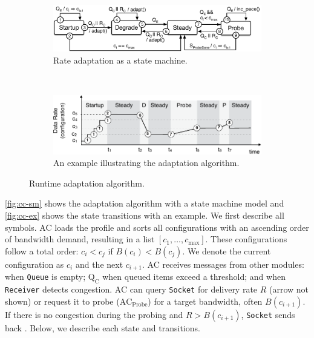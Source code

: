 \begin{figure}
  \begin{subfigure}[t]{\columnwidth}
    \centering
    \includegraphics[width=\columnwidth]{figures/cc.pdf}
    \caption{Rate adaptation as a state machine.}
    \label{fig:cc-sm}
  \end{subfigure}
  \\
  \vspace{1em}
  \centering
  \begin{subfigure}[t]{\columnwidth}
    \centering
    \includegraphics[width=0.9\columnwidth]{figures/cc2.pdf}
    \caption{An example illustrating the adaptation algorithm.}
    \label{fig:cc-ex}
  \end{subfigure}
  \caption{Runtime adaptation algorithm.}
  \label{fig:cc}
\end{figure}

\autoref{fig:cc-sm} shows the adaptation algorithm with a state machine model
and \autoref{fig:cc-ex} shows the state transitions with an example. We first
describe all symbols. AC loads the profile and sorts all configurations with an
ascending order of bandwidth demand, resulting in a list
$[c_1, \dots, c_{\max}]$.  These configurations follow a total order:
$c_i < c_j$ if $B(c_i) < B(c_j)$.  We denote the current configuration as $c_i$
and the next $c_{i+1}$.  AC receives messages from other modules: \qe{} when
\texttt{Queue} is empty; $\text{Q}_\text{C}$ when queued items exceed a
threshold; and \rc{} when \texttt{Receiver} detects congestion. AC can query
\texttt{Socket} for delivery rate $R$ (arrow not shown) or request it to probe
($\text{AC}_{\text{Probe}}$) for a target bandwidth, often $B(c_{i+1})$. If
there is no congestion during the probing and $R > B(c_{i+1})$, \texttt{Socket}
sends back \spd{}. Below, we describe each state and transitions.


